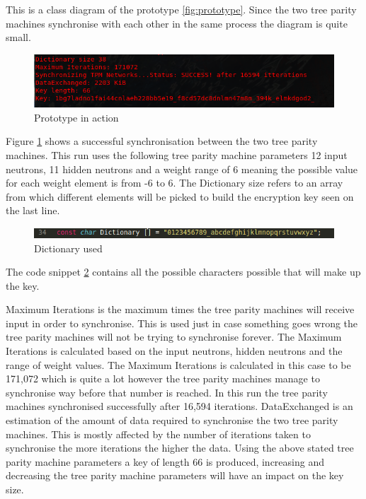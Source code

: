 \FloatBarrier

This is a class diagram of the prototype \ref{fig:prototype}. Since the two tree parity machines synchronise with each other in the same process the diagram is quite small.

\begin{figure}[!h]
  \centering
      \includegraphics[width=1\textwidth]{Figures/proto2.png}
  \caption[Prototype in action]{Prototype in action}
  \label{fig:prototype2}
\end{figure}
\FloatBarrier

\FloatBarrier
Figure \ref{fig:prototype2} shows a successful synchronisation between the two tree parity machines.
This run uses the following tree parity machine parameters 12 input neutrons, 11 hidden neutrons and a weight range of 6 meaning the possible value for each weight element is from -6 to 6.  
The Dictionary size refers to an array from which different elements will be picked to build the encryption key seen on the last line.

\begin{figure}[!h]
  \centering
      \includegraphics[width=1\textwidth]{Figures/proto4.png}
  \caption[Dictionary used]{Dictionary used}
  \label{fig:prototype4}
\end{figure}
\FloatBarrier
The code snippet \ref{fig:prototype4} contains all the possible characters possible that will make up the key. 

Maximum Iterations is the maximum times the tree parity machines will receive input in order to synchronise. This is used just in case something goes wrong the tree parity machines will not be trying to synchronise forever. The Maximum Iterations is calculated based on the input neutrons, hidden neutrons and the range of weight values. The Maximum Iterations is calculated in this case to be 171,072 which is quite a lot however the tree parity machines manage to synchronise way before that number is reached. In this run the tree parity machines synchronised successfully after 16,594 iterations. 
DataExchanged is an estimation of the amount of data required to synchronise the two tree parity machines. This is mostly affected by the number of iterations taken to synchronise the more iterations the higher the data. 
Using the above stated tree parity machine parameters a key of length 66 is produced, increasing and decreasing the tree parity machine parameters will have an impact on the key size.


